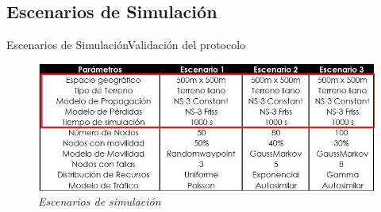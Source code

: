 \subsection{Escenarios de Simulación}
\begin{frame}{Escenarios de Simulación}{Validación del protocolo}
    \begin{figure}				
		\includegraphics[width=\textwidth,height=\textheight,keepaspectratio]{Figures/ParSim.JPG}
		\caption{\small \sl Escenarios de simulación}
		\label{figure:ParSim}
    \end{figure}
\end{frame}
